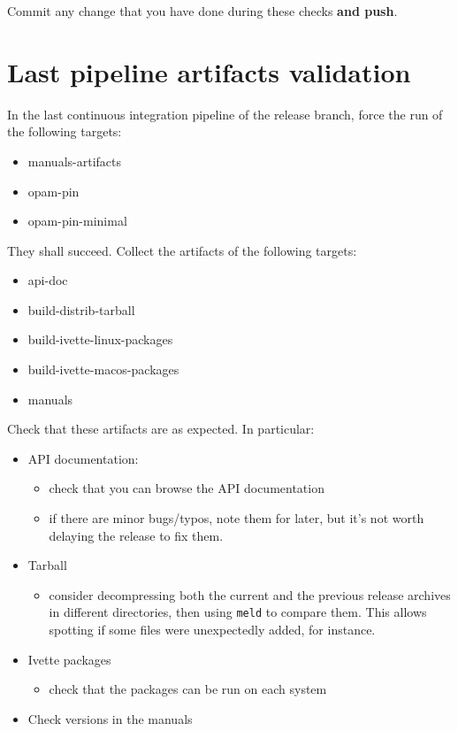 Commit any change that you have done during these checks \textbf{and push}.

\section{Last pipeline artifacts validation}

In the last continuous integration pipeline of the release branch, force the
run of the following targets:
\begin{itemize}
  \item manuals-artifacts
  \item opam-pin
  \item opam-pin-minimal
\end{itemize}
They shall succeed. Collect the artifacts of the following targets:
\begin{itemize}
  \item api-doc
  \item build-distrib-tarball
  \item build-ivette-linux-packages
  \item build-ivette-macos-packages
  \item manuals
\end{itemize}

\noindent Check that these artifacts are as expected. In particular:
\begin{itemize}
  \item API documentation:
    \begin{itemize}
      \item check that you can browse the API documentation
      \item if there are minor bugs/typos, note them for later, but it's not
        worth delaying the release to fix them.
    \end{itemize}
  \item Tarball
    \begin{itemize}
      \item consider decompressing both the current and the previous release
         archives in different directories, then using \texttt{meld} to compare
         them. This allows spotting if some files were unexpectedly added, for
         instance.
    \end{itemize}
  \item Ivette packages
    \begin{itemize}
      \item check that the packages can be run on each system
    \end{itemize}
  \item Check versions in the manuals
\end{itemize}

